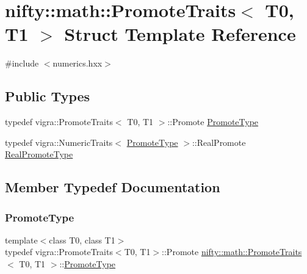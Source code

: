 \hypertarget{structnifty_1_1math_1_1PromoteTraits}{}\section{nifty\+:\+:math\+:\+:Promote\+Traits$<$ T0, T1 $>$ Struct Template Reference}
\label{structnifty_1_1math_1_1PromoteTraits}


{\ttfamily \#include $<$numerics.\+hxx$>$}

\subsection*{Public Types}
\begin{DoxyCompactItemize}
\item 
typedef vigra\+::\+Promote\+Traits$<$ T0, T1 $>$\+::Promote \hyperlink{structnifty_1_1math_1_1PromoteTraits_abcfa7e97456339d61654b607fd8b03f2}{Promote\+Type}
\item 
typedef vigra\+::\+Numeric\+Traits$<$ \hyperlink{structnifty_1_1math_1_1PromoteTraits_abcfa7e97456339d61654b607fd8b03f2}{Promote\+Type} $>$\+::Real\+Promote \hyperlink{structnifty_1_1math_1_1PromoteTraits_a21f91936d2b9aff18c220bc86529df98}{Real\+Promote\+Type}
\end{DoxyCompactItemize}


\subsection{Member Typedef Documentation}
\mbox{\label{structnifty_1_1math_1_1PromoteTraits_abcfa7e97456339d61654b607fd8b03f2}} 
\subsubsection{\texorpdfstring{Promote\+Type}{PromoteType}}
{\footnotesize\ttfamily template$<$class T0, class T1$>$ \\
typedef vigra\+::\+Promote\+Traits$<$T0, T1$>$\+::Promote \hyperlink{structnifty_1_1math_1_1PromoteTraits}{nifty\+::math\+::\+Promote\+Traits}$<$ T0, T1 $>$\+::\hyperlink{structnifty_1_1math_1_1PromoteTraits_abcfa7e97456339d61654b607fd8b03f2}{Promote\+Type}}

